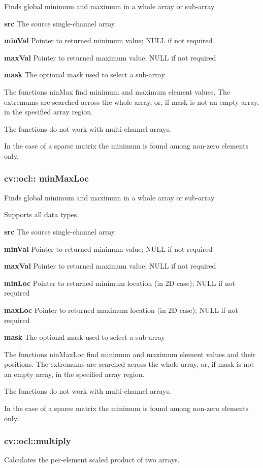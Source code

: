 \documentclass{article}
\begin{document}
Finds global minimum and maximum in a whole array or sub-array

\textbf{src }The source single-channel array

\textbf{minVal }Pointer to returned minimum value; NULL if not required

\textbf{maxVal }Pointer to returned maximum value; NULL if not required

\textbf{mask }The optional mask used to select a sub-array

The functions ninMax find minimum and maximum element values. The extremums
are searched across the whole array, or, if mask is not an empty array, in
the specified array region.

The functions do not work with multi-channel arrays.

In the case of a sparse matrix the minimum is found among non-zero elements
only.

\newpage

\subsubsection{cv::ocl:: minMaxLoc }
\label{subsubsec:mylabel22}
Finds global minimum and maximum in a whole array or sub-array

Supports all data types.

\textbf{src }The source single-channel array

\textbf{minVal }Pointer to returned minimum value; NULL if not required

\textbf{maxVal }Pointer to returned maximum value; NULL if not required

\textbf{minLoc }Pointer to returned minimum location (in 2D case); NULL if
not required

\textbf{maxLoc }Pointer to returned maximum location (in 2D case); NULL if
not required

\textbf{mask }The optional mask used to select a sub-array

The functions ninMaxLoc find minimum and maximum element values and their
positions. The extremums are searched across the whole array, or, if mask is
not an empty array, in the specified array region.

The functions do not work with multi-channel arrays.

In the case of a sparse matrix the minimum is found among non-zero elements
only.

\newpage

\subsubsection{cv::ocl::multiply}
\label{subsubsec:mylabel23}
Calculates the per-element scaled product of two arrays.
\end{document}
